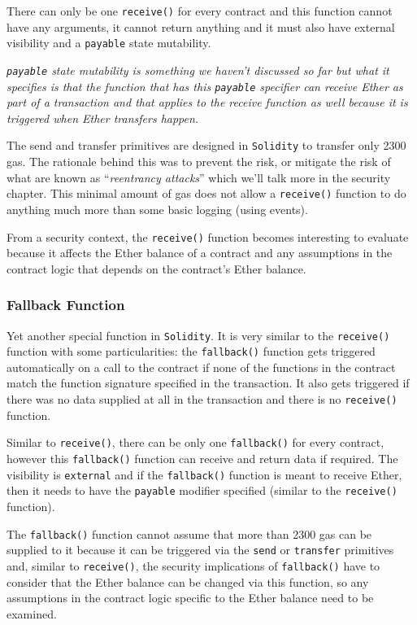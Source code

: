 There can only be one \texttt{receive()} for every contract and this
function cannot have any arguments, it cannot return anything and it
must also have external visibility and a \texttt{payable} state
mutability.

\emph{\texttt{payable} state mutability is something we haven't
discussed so far but what it specifies is that the function that has
this \texttt{payable} specifier can receive Ether as part of a
transaction and that applies to the receive function as well because it
is triggered when Ether transfers happen.}

The send and transfer primitives are designed in \texttt{Solidity} to
transfer only 2300 gas. The rationale behind this was to prevent the
risk, or mitigate the risk of what are known as ``\emph{reentrancy
attacks}'' which we'll talk more in the security chapter. This minimal
amount of gas does not allow a \texttt{receive()} function to do
anything much more than some basic logging (using events).

From a security context, the \texttt{receive()} function becomes
interesting to evaluate because it affects the Ether balance of a
contract and any assumptions in the contract logic that depends on the
contract's Ether balance.

\subsubsection{Fallback Function}\label{fallback-function}

Yet another special function in \texttt{Solidity}. It is very similar to
the \texttt{receive()} function with some particularities: the
\texttt{fallback()} function gets triggered automatically on a call to
the contract if none of the functions in the contract match the function
signature specified in the transaction. It also gets triggered if there
was no data supplied at all in the transaction and there is no
\texttt{receive()} function.

Similar to \texttt{receive()}, there can be only one \texttt{fallback()}
for every contract, however this \texttt{fallback()} function can
receive and return data if required. The visibility is \texttt{external}
and if the \texttt{fallback()} function is meant to receive Ether, then
it needs to have the \texttt{payable} modifier specified (similar to the
\texttt{receive()} function).

The \texttt{fallback()} function cannot assume that more than 2300 gas
can be supplied to it because it can be triggered via the \texttt{send}
or \texttt{transfer} primitives and, similar to \texttt{receive()}, the
security implications of \texttt{fallback()} have to consider that the
Ether balance can be changed via this function, so any assumptions in
the contract logic specific to the Ether balance need to be examined.
